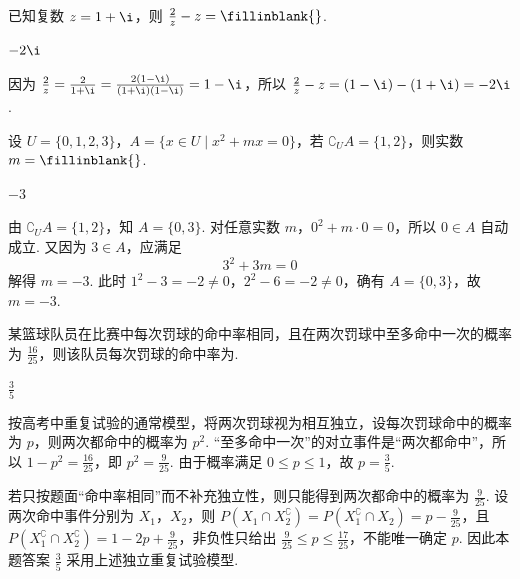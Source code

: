 \begin{problem}
已知复数 \(z = 1 + \i\)，则 \(\frac{2}{z} - z =\fillinblank{}\).

\begin{answer}
\(-2\i\)
\end{answer}

\begin{solution}
因为 \(\frac{2}{z}=\frac{2}{1+\i}=\frac{2(1-\i)}{(1+\i)(1-\i)}=1-\i\)，所以 \(\frac{2}{z}-z=(1-\i)-(1+\i)=-2\i\).
\end{solution}
\end{problem}

\begin{problem}
设 \(U = \{0, 1, 2, 3\}\)，\(A = \{x \in U \mid x^2 + mx = 0\}\)，若 \(\complement_U A = \{1, 2\}\)，则实数 \(m =\fillinblank{}\).

\begin{answer}
\(-3\)
\end{answer}

\begin{solution}
由 \(\complement_U A=\{1,2\}\)，知 \(A=\{0,3\}\). 对任意实数 \(m\)，\(0^2+m\cdot0=0\)，所以 \(0\in A\) 自动成立. 又因为 \(3\in A\)，应满足
\[
3^2+3m=0
\]
解得 \(m=-3\). 此时 \(1^2-3=-2\ne0\)，\(2^2-6=-2\ne0\)，确有 \(A=\{0,3\}\)，故 \(m=-3\).
\end{solution}
\end{problem}

\begin{problem}
某篮球队员在比赛中每次罚球的命中率相同，且在两次罚球中至多命中一次的概率为 \(\frac{16}{25}\)，则该队员每次罚球的命中率为\fillinblank{}.

\begin{answer}
\(\frac{3}{5}\)
\end{answer}

\begin{solution}
按高考中重复试验的通常模型，将两次罚球视为相互独立，设每次罚球命中的概率为 \(p\)，则两次都命中的概率为 \(p^2\). “至多命中一次”的对立事件是“两次都命中”，所以 \(1-p^2=\frac{16}{25}\)，即 \(p^2=\frac{9}{25}\). 由于概率满足 \(0\leqslant p\leqslant1\)，故 \(p=\frac35\).

若只按题面“命中率相同”而不补充独立性，则只能得到两次都命中的概率为 \(\frac{9}{25}\). 设两次命中事件分别为 \(X_1\)，\(X_2\)，则
\(P(X_1\cap X_2^{\complement})=P(X_1^{\complement}\cap X_2)=p-\frac{9}{25}\)，且
\(P(X_1^{\complement}\cap X_2^{\complement})=1-2p+\frac{9}{25}\)，非负性只给出 \(\frac{9}{25}\leqslant p\leqslant\frac{17}{25}\)，不能唯一确定 \(p\). 因此本题答案 \(\frac35\) 采用上述独立重复试验模型.
\end{solution}
\end{problem}

